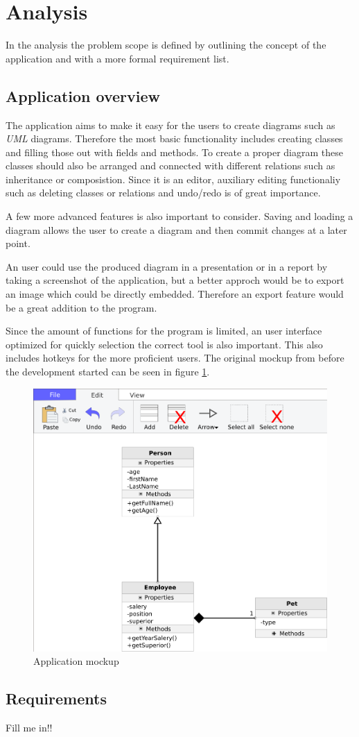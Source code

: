 \section{Analysis}
In the analysis the problem scope is defined by outlining the concept of the
application and with a more formal requirement list. 

\subsection{Application overview}
The application aims to make it easy for the users to create diagrams such as
\textit{UML} diagrams. Therefore the most basic functionality includes creating
classes and filling those out with fields and methods. To create a proper
diagram these classes should also be arranged and connected with different
relations such as inheritance or composistion. Since it is an editor, auxiliary
editing functionaliy such as deleting classes or relations and undo/redo is
of great importance. 

A few more advanced features is also important to consider. Saving and loading a
diagram allows the user to create a diagram and then commit changes at a later
point.

An user could use the produced diagram in a presentation or in a report by
taking a screenshot of the application, but a better approch would be to export
an image which could be directly embedded. Therefore an export feature would be
a great addition to the program. 

Since the amount of functions for the program is limited, an user interface
optimized for quickly selection the correct tool is also important. This also
includes hotkeys for the more proficient users. The original mockup from before
the development started can be seen in figure \ref{mockup}.
\begin{figure}[H]
\centering
\includegraphics[width=\linewidth]{img/mockup}
\caption{Application mockup \label{mockup}}
\end{figure}

\subsection{Requirements}
Fill me in!!

